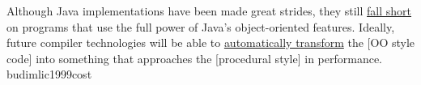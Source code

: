 \documentclass{article}
\begin{document}

  {Although Java implementations have been made great strides, they still \ul{fall short} on programs that use the full power of Java's object-oriented features. Ideally, future compiler technologies will be able to \ul{automatically transform} the [OO style code] into something that approaches the [procedural style] in performance.}
  {budimlic1999cost}
\end{document}
